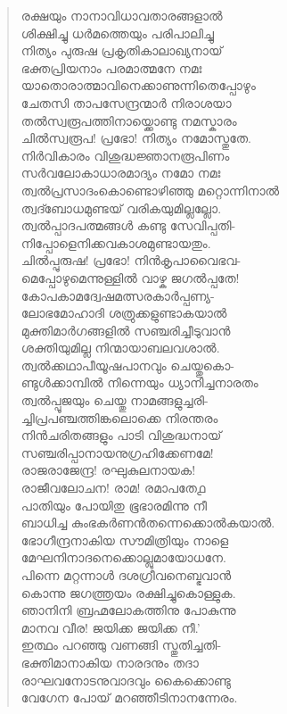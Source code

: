 \begin{verse}
രക്ഷയും നാനാവിധാവതാരങ്ങളാല്‍\\
ശിക്ഷിച്ചു ധര്‍മത്തെയും പരിപാലിച്ചു\\
നിത്യം പുരുഷ പ്രകൃതികാലാഖ്യനായ്\\
ഭക്തപ്രിയനാം പരമാത്മനേ നമഃ\\
യാതൊരാത്മാവിനെക്കാണുന്നിതെപ്പോഴും\\
ചേതസി താപസേന്ദ്രന്മാര്‍ നിരാശയാ\\
തല്‍സ്വരൂപത്തിനായ്ക്കൊണ്ടു നമസ്കാരം\\
ചില്‍സ്വരൂപ! പ്രഭോ! നിത്യം നമോസ്തുതേ.\\
നിര്‍വികാരം വിശുദ്ധജ്ഞാനരൂപിണം\\
സര്‍വലോകാധാരമാദ്യം നമോ നമഃ\\
ത്വല്‍പ്രസാദംകൊണ്ടൊഴിഞ്ഞു മറ്റൊന്നിനാല്‍\\
ത്വദ്ബോധമുണ്ടയ് വരികയുമില്ലല്ലോ.\\
ത്വല്‍പ്പാദപത്മങ്ങള്‍ കണ്ടു സേവിപ്പതി-\\
നിപ്പോളെനിക്കവകാശമുണ്ടായതും.\\
ചില്‍പ്പുരുഷ! പ്രഭോ! നിന്‍കൃപാവൈഭവ-\\
മെപ്പോഴുമെന്നുള്ളില്‍ വാഴ്ക ജഗല്‍പ്പതേ!\\
കോപകാമദ്വേഷമത്സരകാര്‍പ്പണ്യ-\\
ലോഭമോഹാദി ശത്രുക്കളുണ്ടാകയാല്‍\\
മുക്തിമാര്‍ഗങ്ങളില്‍ സഞ്ചരിച്ചീടുവാന്‍\\
ശക്തിയുമില്ല നിന്മായാബലവശാല്‍.\\
ത്വല്‍ക്കഥാപീയൂഷപാനവും ചെയ്തുകൊ-\\
ണ്ടുള്‍ക്കാമ്പില്‍ നിന്നെയും ധ്യാനിച്ചനാരതം\\
ത്വല്‍പ്പൂജയും ചെയ്തു നാമങ്ങളുച്ചരി-\\
ച്ചിപ്രപഞ്ചത്തിങ്കലൊക്കെ നിരന്തരം\\
നിന്‍ചരിതങ്ങളും പാടി വിശുദ്ധനായ്\\
സഞ്ചരിപ്പാനായനുഗ്രഹിക്കേണമേ!\\
രാജരാജേന്ദ്ര! രഘുകുലനായക!\\
രാജീവലോചന! രാമ! രമാപതേ൧\\
പാതിയും പോയിതു ഭൂഭാരമിന്നു നീ\\
ബാധിച്ച കുംഭകര്‍ണന്‍തന്നെക്കൊല്‍കയാല്‍.\\
ഭോഗീന്ദ്രനാകിയ സൗമിത്രിയും നാളെ\\
മേഘനിനാദനെക്കൊല്ലുമായോധനേ.\\
പിന്നെ മറ്റന്നാള്‍ ദശഗ്രീവനെബ്ഭവാന്‍\\
കൊന്നു ജഗത്ത്രയം രക്ഷിച്ചുകൊള്ളുക.\\
ഞാനിനി ബ്രഹ്മലോകത്തിനു പോകുന്നു\\
മാനവ വീര! ജയിക്ക ജയിക്ക നീ.’\\
ഇത്ഥം പറഞ്ഞു വണങ്ങി സ്തുതിച്ചതി-\\
ഭക്തിമാനാകിയ നാരദനും തദാ\\
രാഘവനോടനുവാദവും കൈക്കൊണ്ടു\\
വേഗേന പോയ് മറഞ്ഞീടിനാനന്നേരം.
\end{verse}

